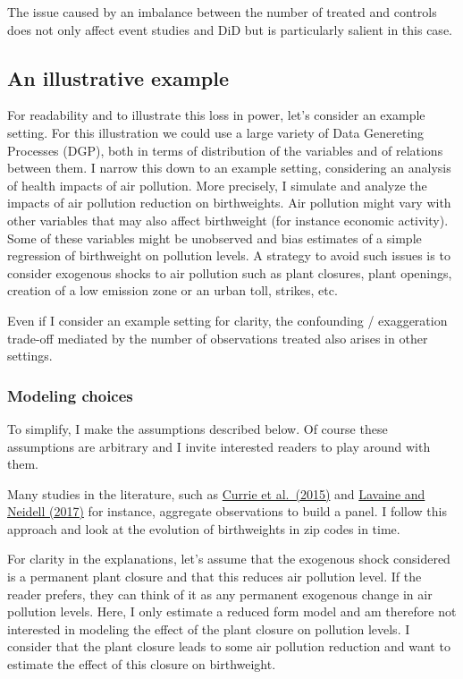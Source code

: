 \documentclass[
]{article}
\begin{document}
The issue caused by an imbalance between the number of treated and
controls does not only affect event studies and DiD but is particularly
salient in this case.

\hypertarget{an-illustrative-example}{%
\subsection{An illustrative example}\label{an-illustrative-example}}

For readability and to illustrate this loss in power, let's consider an
example setting. For this illustration we could use a large variety of
Data Genereting Processes (DGP), both in terms of distribution of the
variables and of relations between them. I narrow this down to an
example setting, considering an analysis of health impacts of air
pollution. More precisely, I simulate and analyze the impacts of air
pollution reduction on birthweights. Air pollution might vary with other
variables that may also affect birthweight (for instance economic
activity). Some of these variables might be unobserved and bias
estimates of a simple regression of birthweight on pollution levels. A
strategy to avoid such issues is to consider exogenous shocks to air
pollution such as plant closures, plant openings, creation of a low
emission zone or an urban toll, strikes, etc.

Even if I consider an example setting for clarity, the confounding /
exaggeration trade-off mediated by the number of observations treated
also arises in other settings.

\hypertarget{modeling-choices}{%
\subsubsection{Modeling choices}\label{modeling-choices}}

To simplify, I make the assumptions described below. Of course these
assumptions are arbitrary and I invite interested readers to play around
with them.

Many studies in the literature, such as
\href{https://www.aeaweb.org/articles?id=10.1257/aer.20121656}{Currie et
al.~(2015)} and
\href{https://www.journals.uchicago.edu/doi/full/10.1086/691554}{Lavaine
and Neidell (2017)} for instance, aggregate observations to build a
panel. I follow this approach and look at the evolution of birthweights
in zip codes in time.

For clarity in the explanations, let's assume that the exogenous shock
considered is a permanent plant closure and that this reduces air
pollution level. If the reader prefers, they can think of it as any
permanent exogenous change in air pollution levels. Here, I only
estimate a reduced form model and am therefore not interested in
modeling the effect of the plant closure on pollution levels. I consider
that the plant closure leads to some air pollution reduction and want to
estimate the effect of this closure on birthweight.
\end{document}
